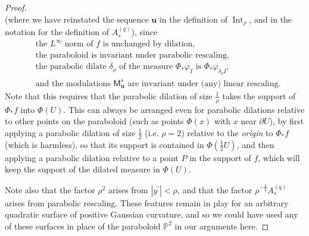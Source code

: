 \documentclass{amsart}%
\theoremstyle{plain}
\numberwithin{equation}{section}
\begin{document}
\begin{proof}
\[\]
(where we have reinstated the sequence $\mathbf{u}$ in the definition of
$\operatorname*{Int}_{\rho}$, and in the notation for the definition of
$A_{s}^{\left(  q\right)  }$), since%
\begin{align*}
&  \text{the }L^{\infty}\text{ norm of }f\text{ is unchanged by dilation,}\\
&  \text{the paraboloid is invariant under parabolic rescaling,}\\
&  \text{the parabolic dilate }\delta_{\rho}\text{ of the measure }\Phi_{\ast
}\varphi_{I}\text{ is }\Phi_{\ast}\varphi_{\delta_{\rho}I}\text{,}\\
&  \text{and the modulations }\mathsf{M}_{\mathbf{u}}^{s}\text{ are invariant
under (any) linear rescaling.}%
\end{align*}
\newline Note that this requires that the parabolic dilation of size $\frac
{1}{\rho}$ takes the support of $\Phi_{\ast}f$ into $\Phi\left(  U\right)  $.
This can always be arranged even for parabolic dilations relative to other
points on the paraboloid (such as points $\Phi\left(  x\right)  $ with $x$
near $\partial U$), by first applying a parabolic dilation of size $\frac
{1}{2}$ (i.e. $\rho=2$) relative to the \emph{origin} to $\Phi_{\ast}f$ (which
is harmless), so that its support is contained in $\Phi\left(  \frac{1}%
{2}U\right)  $, and then applying a parabolic dilation relative to a point $P$
in the support of $f$, which will keep the support of the dilated measure in
$\Phi\left(  U\right)  $.

Note also that the factor $\rho^{2}$ arises from $\left\vert y^{\prime
}\right\vert <\rho$, and that the factor $\rho^{-\frac{4}{q}}A_{s}^{\left(
q\right)  }$ arises from parabolic rescaling. These features remain in play
for an arbitrary quadratic surface of positive Gaussian curvature, and so we
could have used any of these surfaces in place of the paraboloid
$\mathbb{P}^{2}$ in our arguments here.


\end{proof}
\end{document}
